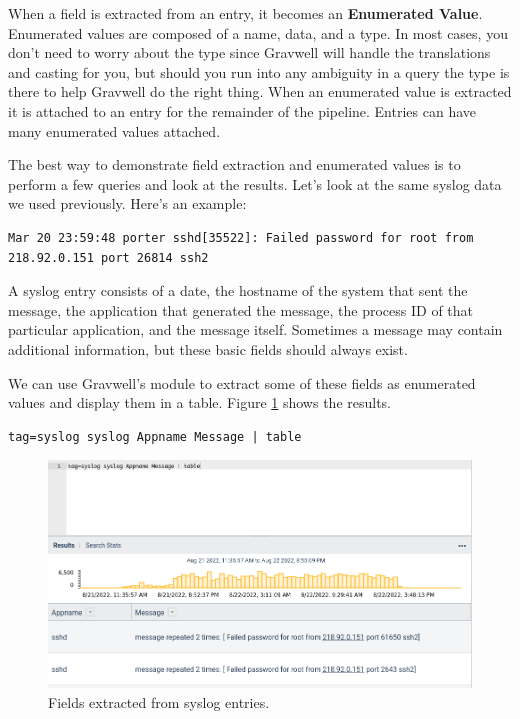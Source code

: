 When a field is extracted from an entry, it becomes an \textbf{Enumerated Value}.
Enumerated values are composed of a name, data, and a type. In
most cases, you don't need to worry about the type since Gravwell will
handle the translations and casting for you, but should you run into any
ambiguity in a query the type is there to help Gravwell do the right
thing. When an enumerated value is extracted it is attached to an
entry for the remainder of the pipeline. Entries can have many enumerated values attached.

The best way to demonstrate field extraction and enumerated values is
to perform a few queries and look at the results. Let's look at the same
syslog data we used previously. Here's an example:

\begin{Verbatim}[breaklines=true]
Mar 20 23:59:48 porter sshd[35522]: Failed password for root from 218.92.0.151 port 26814 ssh2
\end{Verbatim}

A syslog entry consists of a date, the hostname of the system that sent the message, the application that generated the message, the process ID of that particular application, and the message itself. Sometimes a message may contain additional information, but these basic fields should always exist.

We can use Gravwell's  module to extract some of these fields as enumerated values and display them in a table. Figure \ref{fig:extract-syslog} shows the results.

\begin{Verbatim}[breaklines=true]
tag=syslog syslog Appname Message | table
\end{Verbatim}

\begin{figure}
	\includegraphics[width=0.8\linewidth]{images/extract-syslog.png}
	\caption{Fields extracted from syslog entries.}
	\label{fig:extract-syslog}
\end{figure}

